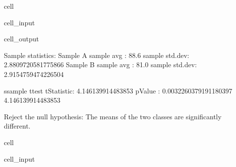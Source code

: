 \documentclass[letterpaper,10pt,italian]{jupyterBook}
\begin{document}
\begin{sphinxuseclass}{cell}
\begin{sphinxVerbatimInput}
\begin{sphinxuseclass}{cell_input}
\end{sphinxuseclass}\end{sphinxVerbatimInput}
\begin{sphinxVerbatimOutput}

\begin{sphinxuseclass}{cell_output}
\begin{sphinxVerbatim}[commandchars=\\\{\}]
Sample statistics:
Sample A
 sample avg    : 88.6
 sample std.dev: 2.8809720581775866
Sample B
 sample avg    : 81.0
 sample std.dev: 2.9154759474226504

s\PYGZhy{}sample t\PYGZhy{}test
 t\PYGZhy{}Statistic: 4.146139914483853
 p\PYGZhy{}Value    : 0.0032260379191180397
4.146139914483853

Reject the null hypothesis: The means of the two classes are significantly different.
\end{sphinxVerbatim}

\begin{sphinxVerbatim}
\end{sphinxVerbatim}

\noindent{}

\end{sphinxuseclass}\end{sphinxVerbatimOutput}

\end{sphinxuseclass}
\begin{sphinxuseclass}{cell}\begin{sphinxVerbatimInput}

\begin{sphinxuseclass}{cell_input}
\begin{sphinxVerbatim}[commandchars=\\\{\}]
\end{sphinxVerbatim}

\end{sphinxuseclass}\end{sphinxVerbatimInput}

\end{sphinxuseclass}
\sphinxstepscope
\end{document}
